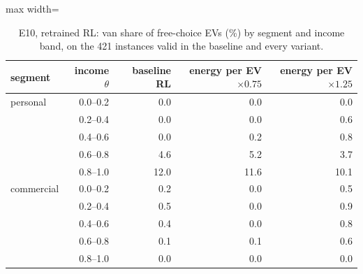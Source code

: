 \begin{table}[H]\centering
\small
\caption{E10, retrained RL: van share of free-choice EVs (\%) by segment and income band, on the 421 instances valid in the baseline and every variant.}\label{tab:bandE10}
\begin{adjustbox}{max width=\textwidth}\begin{tabular}{lrrrr}\toprule
segment & income $\theta$ & baseline RL & energy per EV $\times0.75$ & energy per EV $\times1.25$ \\ \midrule
personal & 0.0--0.2 & 0.0 & 0.0 & 0.0 \\
 & 0.2--0.4 & 0.0 & 0.0 & 0.6 \\
 & 0.4--0.6 & 0.0 & 0.2 & 0.8 \\
 & 0.6--0.8 & 4.6 & 5.2 & 3.7 \\
 & 0.8--1.0 & 12.0 & 11.6 & 10.1 \\
commercial & 0.0--0.2 & 0.2 & 0.0 & 0.5 \\
 & 0.2--0.4 & 0.5 & 0.0 & 0.9 \\
 & 0.4--0.6 & 0.4 & 0.0 & 0.8 \\
 & 0.6--0.8 & 0.1 & 0.1 & 0.6 \\
 & 0.8--1.0 & 0.0 & 0.0 & 0.0 \\
\bottomrule\end{tabular}\end{adjustbox}\end{table}
